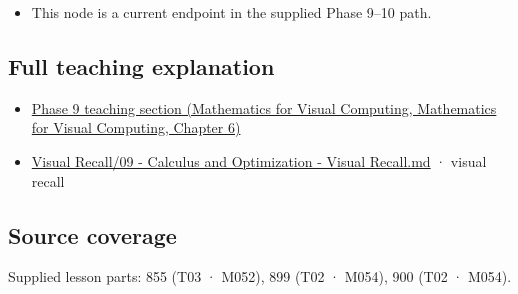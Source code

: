\begin{itemize}
\tightlist
\item
  This node is a current endpoint in the supplied Phase 9--10 path.
\end{itemize}

\subsection{Full teaching explanation}\label{appendix-8836553d56fc-full-teaching-explanation}

\begin{itemize}
\tightlist
\item
  \href{../02-Mathematics-for-Visual-Computing/main.pdf\#nameddest=02-foundations-ii-ch022-numerical-differentiation-and-automatic-differentiation}{Phase 9 teaching section (Mathematics for Visual Computing, Mathematics for Visual Computing, Chapter 6)}
\item
  \hyperref[appendix-adf48f5dc5c1]{Visual Recall/09 - Calculus and Optimization - Visual Recall.md} · visual recall
\end{itemize}

\subsection{Source coverage}\label{appendix-8836553d56fc-source-coverage}

Supplied lesson parts: 855 (T03 · M052), 899 (T02 · M054), 900 (T02 · M054).

